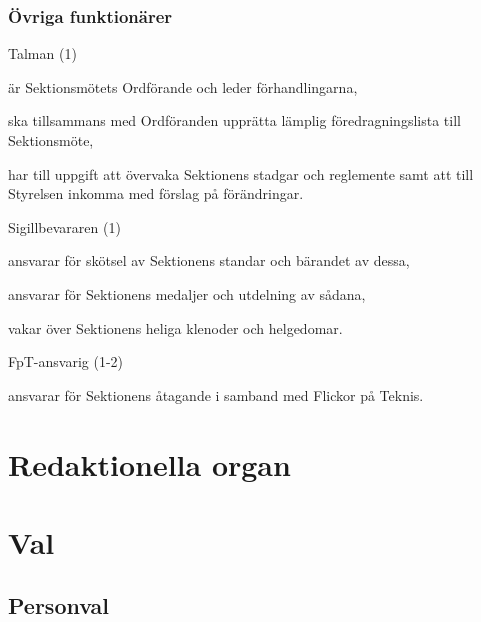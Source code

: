 \documentclass[10pt]{article}
\renewcommand{\thesubsection}{\arabic{section}:\Alph{subsection}}
\begin{document}
\subsubsection{Övriga funktionärer}
\begin{emptylist}
    \item Talman (1)
        \begin{dashlist}
            \item är Sektionsmötets Ordförande och leder förhandlingarna,
            \item ska tillsammans med Ordföranden upprätta lämplig
                föredragningslista till Sektionsmöte,
            \item har till uppgift att övervaka Sektionens stadgar och
                reglemente samt att till Styrelsen inkomma med förslag på
                förändringar.
        \end{dashlist}
    \item Sigillbevararen (1)
        \begin{dashlist}
            \item ansvarar för skötsel av Sektionens standar och bärandet av
                dessa,
            \item ansvarar för Sektionens medaljer och utdelning av sådana,
            \item vakar över Sektionens heliga klenoder och helgedomar.
        \end{dashlist}
    \item FpT-ansvarig (1-2)
        \begin{dashlist}
            \item ansvarar för Sektionens åtagande i samband med Flickor på
                Teknis.
        \end{dashlist}
\end{emptylist}
\renewcommand*\thesubsection{\arabic{section}:\Alph{subsection}}
\section{Redaktionella organ}

\section{Val}

\subsection{Personval}
\end{document}
